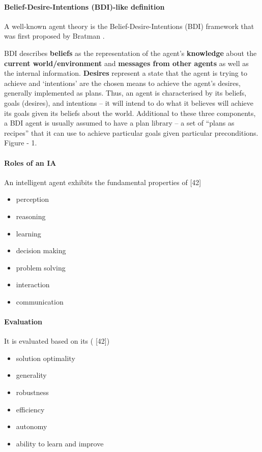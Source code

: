 \documentclass{article}
\begin{document}
	 
	 \paragraph{Belief-Desire-Intentions (BDI)-like definition}
	 A well-known agent theory  is the Belief-Desire-Intentions (BDI) framework that was first proposed by Bratman \citep{bratman-1999-intention-plans-and-practical-reason}. 
	 
	 BDI  describes \textbf{beliefs} as the representation of the agent’s \textbf{knowledge} about the \textbf{current world/environment} and \textbf{messages from other agents} as well as the internal information. \textbf{Desires} represent a state that the agent is trying to achieve and ‘intentions’ are the chosen means to achieve the agent’s desires, generally implemented as plans. Thus, an agent is characterised by its beliefs, goals (desires), and intentions – it will intend to do what it believes will achieve its goals given its beliefs about the world.  Additional to these three components, a BDI agent is usually assumed to have a plan library – a set of “plans as recipes” that it can use to achieve particular goals given particular preconditions.
	 Figure \cite{bratman-1999-intention-plans-and-practical-reason} - 1.  
	 
	 \paragraph{Roles of an IA}
		 An intelligent agent exhibits the fundamental properties of
		 \citet{rizk-2018-decision-making-in-multiagent-systems-a-survey} [42]
		 \begin{itemize}
		 	\item perception
		 	\item reasoning
		 	\item learning
		 	\item decision making
		 	\item problem solving
		 	\item interaction
		 	\item communication
		 \end{itemize}
	 
	 \paragraph{Evaluation}
		  It is evaluated based on its (\citet{rizk-2018-decision-making-in-multiagent-systems-a-survey} [42])
		 \begin{itemize}
		 	\item solution optimality
		 	\item generality
		 	\item robustness
		 	\item efficiency
		 	\item autonomy
		 	\item ability to learn and improve
		 \end{itemize}
	  
\end{document}
